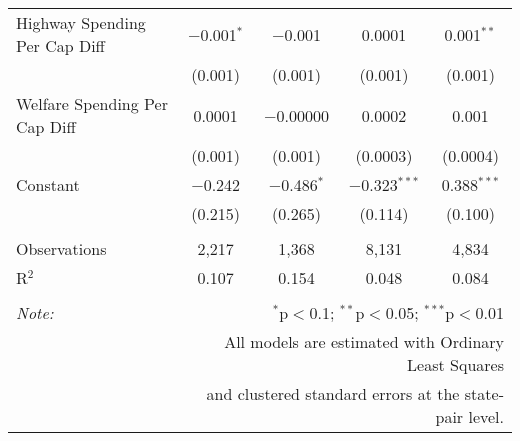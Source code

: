 \begin{table}[!htbp]
\begin{tabular}{@{\extracolsep{5pt}}lcccc}
  Highway Spending Per Cap Diff & $-$0.001$^{*}$ & $-$0.001 & 0.0001 & 0.001$^{**}$ \\ 
  & (0.001) & (0.001) & (0.001) & (0.001) \\ 
  Welfare Spending Per Cap Diff & 0.0001 & $-$0.00000 & 0.0002 & 0.001 \\ 
  & (0.001) & (0.001) & (0.0003) & (0.0004) \\ 
  Constant & $-$0.242 & $-$0.486$^{*}$ & $-$0.323$^{***}$ & 0.388$^{***}$ \\ 
  & (0.215) & (0.265) & (0.114) & (0.100) \\ 
 \hline \\[-1.8ex] 
Observations & 2,217 & 1,368 & 8,131 & 4,834 \\ 
R$^{2}$ & 0.107 & 0.154 & 0.048 & 0.084 \\ 
\hline 
\hline \\[-1.8ex] 
\textit{Note:}  & \multicolumn{4}{r}{$^{*}$p$<$0.1; $^{**}$p$<$0.05; $^{***}$p$<$0.01} \\ 
 & \multicolumn{4}{r}{All models are estimated with Ordinary Least Squares} \\ 
 & \multicolumn{4}{r}{and clustered standard errors at the state-pair level.} \\ 
\end{tabular} 
\end{table} 
